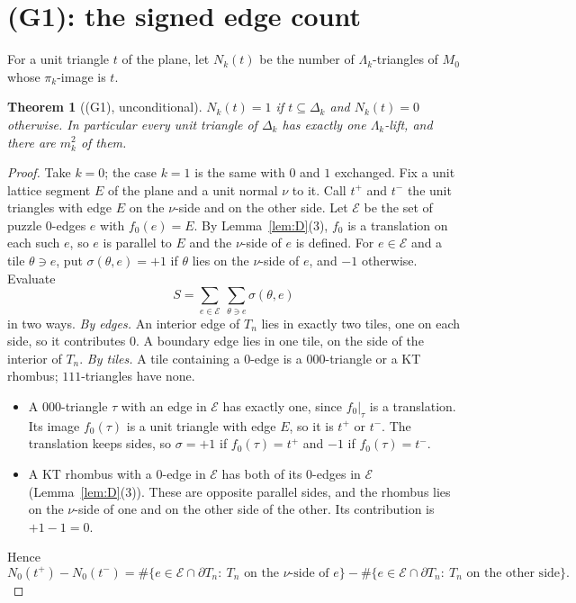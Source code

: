 \documentclass[11pt]{article}
\newtheorem{theorem}{Theorem}\newtheorem{lemma}[theorem]{Lemma}\newtheorem{proposition}[theorem]{Proposition}
\theoremstyle{definition}\newtheorem{definition}[theorem]{Definition}\newtheorem{remark}[theorem]{Remark}
\begin{document}
\section{(G1): the signed edge count}\label{sec:G1}
For a unit triangle $t$ of the plane, let $N_k(t)$ be the number of $\Lambda_k$-triangles of $M_0$ whose $\pi_k$-image is $t$.
\begin{theorem}[(G1), unconditional]\label{thm:G1}
$N_k(t)=1$ if $t\subseteq\Delta_k$ and $N_k(t)=0$ otherwise. In particular every unit triangle of $\Delta_k$ has exactly one $\Lambda_k$-lift, and there are $m_k^2$ of them.
\end{theorem}
\begin{proof}
Take $k=0$; the case $k=1$ is the same with $0$ and $1$ exchanged. Fix a unit lattice segment $E$ of the plane and a unit normal $\nu$ to it. Call $t^+$ and $t^-$ the unit triangles with edge $E$ on the $\nu$-side and on the other side. Let $\mathcal E$ be the set of puzzle $0$-edges $e$ with $f_0(e)=E$. By Lemma~\ref{lem:D}(3), $f_0$ is a translation on each such $e$, so $e$ is parallel to $E$ and the $\nu$-side of $e$ is defined. For $e\in\mathcal E$ and a tile $\theta\ni e$, put $\sigma(\theta,e)=+1$ if $\theta$ lies on the $\nu$-side of $e$, and $-1$ otherwise. Evaluate
\[S=\sum_{e\in\mathcal E}\ \sum_{\theta\ni e}\sigma(\theta,e)\]
in two ways.
\emph{By edges.} An interior edge of $T_n$ lies in exactly two tiles, one on each side, so it contributes $0$. A boundary edge lies in one tile, on the side of the interior of $T_n$.
\emph{By tiles.} A tile containing a $0$-edge is a $000$-triangle or a KT rhombus; $111$-triangles have none.
\begin{itemize}
\item A $000$-triangle $\tau$ with an edge in $\mathcal E$ has exactly one, since $f_0|_\tau$ is a translation. Its image $f_0(\tau)$ is a unit triangle with edge $E$, so it is $t^+$ or $t^-$. The translation keeps sides, so $\sigma=+1$ if $f_0(\tau)=t^+$ and $-1$ if $f_0(\tau)=t^-$.
\item A KT rhombus with a $0$-edge in $\mathcal E$ has both of its $0$-edges in $\mathcal E$ (Lemma~\ref{lem:D}(3)). These are opposite parallel sides, and the rhombus lies on the $\nu$-side of one and on the other side of the other. Its contribution is $+1-1=0$.
\end{itemize}
Hence
\[N_0(t^+)-N_0(t^-)=\#\{e\in\mathcal E\cap\partial T_n:\ T_n\text{ on the $\nu$-side of }e\}-\#\{e\in\mathcal E\cap\partial T_n:\ T_n\text{ on the other side}\}.\]

\end{proof}
\end{document}
